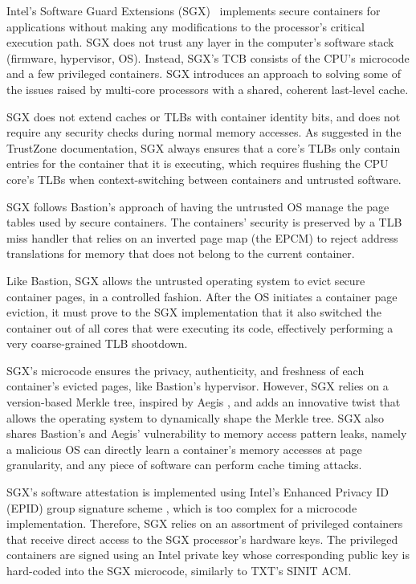 Intel's Software Guard Extensions (SGX)~\cite{mckeen2013sgx, anati2013sgx,
hoekstra2013sgx} implements secure containers for applications without making
any modifications to the processor's critical execution path. SGX does not
trust any layer in the computer's software stack (firmware, hypervisor, OS).
Instead, SGX's TCB consists of the CPU's microcode and a few privileged
containers. SGX introduces an approach to solving some of the issues raised by
multi-core processors with a shared, coherent last-level cache.

SGX does not extend caches or TLBs with container identity bits, and does not
require any security checks during normal memory accesses. As suggested in the
TrustZone documentation, SGX always ensures that a core's TLBs only contain
entries for the container that it is executing, which requires flushing the CPU
core's TLBs when context-switching between containers and untrusted software.

SGX follows Bastion's approach of having the untrusted OS manage the page
tables used by secure containers. The containers' security is preserved by a
TLB miss handler that relies on an inverted page map (the EPCM) to reject
address translations for memory that does not belong to the current container.

Like Bastion, SGX allows the untrusted operating system to evict secure
container pages, in a controlled fashion. After the OS initiates a container
page eviction, it must prove to the SGX implementation that it also switched
the container out of all cores that were executing its code, effectively
performing a very coarse-grained TLB shootdown.

SGX's microcode ensures the privacy, authenticity, and freshness of each
container's evicted pages, like Bastion's hypervisor. However, SGX relies on a
version-based Merkle tree, inspired by Aegis \cite{suh2003aegis}, and adds an innovative twist
that allows the operating system to dynamically shape the Merkle tree. SGX also
shares Bastion's and Aegis' vulnerability to memory access pattern leaks, namely a
malicious OS can directly learn a container's memory accesses at page
granularity, and any piece of software can perform cache timing attacks.

SGX's software attestation is implemented using Intel's Enhanced Privacy ID
(EPID) group signature scheme \cite{brickell2009epid}, which is too complex for
a microcode implementation. Therefore, SGX relies on an assortment of
privileged containers that receive direct access to the SGX processor's
hardware keys. The privileged containers are signed using an Intel private key
whose corresponding public key is hard-coded into the SGX microcode, similarly
to TXT's SINIT ACM.

